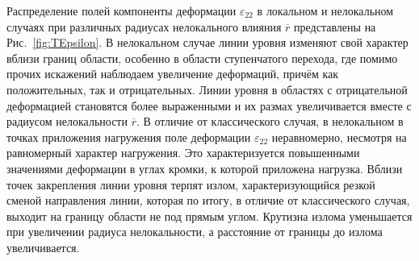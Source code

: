 Распределение полей компоненты деформации $\varepsilon_{22}$ в локальном и нелокальном случаях при различных радиусах нелокального влияния $\overline{r}$ представлены на Рис.~\ref{fig:TEpsilon}. В нелокальном случае линии уровня изменяют свой характер вблизи границ области, особенно в области ступенчатого перехода, где помимо прочих искажений наблюдаем увеличение деформаций, причём как положительных, так и отрицательных. Линии уровня в областях с отрицательной деформацией становятся более выраженными и их размах увеличивается вместе с радиусом нелокальности $\overline{r}$. В отличие от классического случая, в нелокальном в точках приложения нагружения поле деформации $\varepsilon_{22}$ неравномерно, несмотря на равномерный характер нагружения. Это характеризуется повышенными значениями деформации в углах кромки, к которой приложена нагрузка. Вблизи точек закрепления линии уровня терпят излом, характеризующийся резкой сменой направления линии, которая по итогу, в отличие от классического случая, выходит на границу области не под прямым углом. Крутизна излома уменьшается при увеличении радиуса нелокальности, а расстояние от границы до излома увеличивается.

